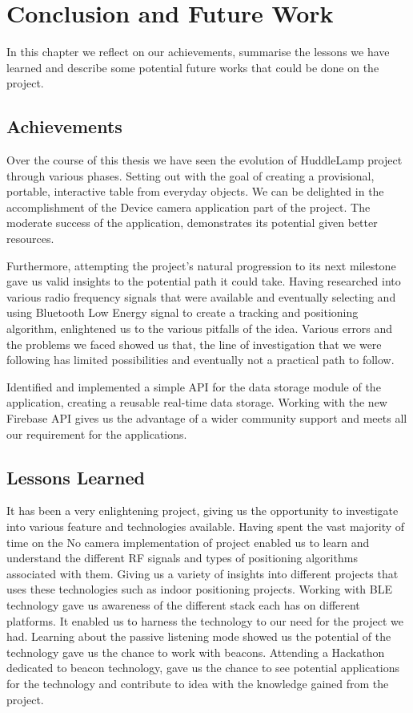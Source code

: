
\chapter{Conclusion and Future Work}

\label{ch:conclusions}

In this chapter we reflect on our achievements, summarise the lessons we have learned and describe some potential future works that could be done on the project.

\section{Achievements}

Over the course of this thesis we have seen the evolution of HuddleLamp project through various phases. Setting out with the goal of creating a provisional, portable, interactive table from everyday objects. We can be delighted in the accomplishment of the Device camera application part of the project. The moderate success of the application, demonstrates its potential given better resources.

Furthermore, attempting the project's natural progression to its next milestone gave us valid insights to the potential path it could take. Having researched into various radio frequency signals that were available and eventually selecting and using Bluetooth Low Energy signal to create a tracking and positioning algorithm, enlightened us to the various pitfalls of the idea. Various errors and the problems we faced showed us that, the line of investigation that we were following has limited possibilities and eventually not a practical path to follow.

Identified and implemented a simple API for the data storage module of the application, creating a reusable real-time data storage. Working with the new Firebase API gives us the advantage of a wider community support and meets all our requirement for the applications.

\section{Lessons Learned}

It has been a very enlightening project, giving us the opportunity to investigate into various feature and technologies available. Having spent the vast majority of time on the No camera implementation of project enabled us to learn and understand the different RF signals and types of positioning algorithms associated with them. Giving us a variety of insights into different projects that uses these technologies such as indoor positioning projects. 
Working with BLE technology gave us awareness of the different stack each has on different platforms. It enabled us to harness the technology to our need for the project we had. Learning about the passive listening mode showed us the potential of the technology gave us the chance to work with beacons. Attending a Hackathon dedicated to beacon technology, gave us the chance to see potential applications for the technology and contribute to idea with the knowledge gained from the project.

